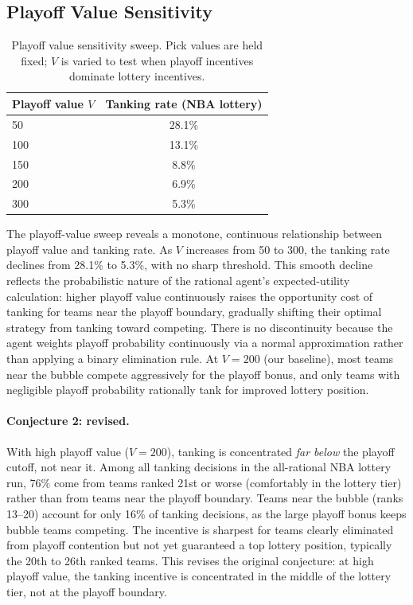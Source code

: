 \documentclass{article}
\begin{document}
\subsection{Playoff Value Sensitivity}

\begin{table}[h]
\centering
\renewcommand{\arraystretch}{1.2}
\begin{tabular}{lc}
\toprule
\textbf{Playoff value $V$} & \textbf{Tanking rate (NBA lottery)} \\
\midrule
50  & 28.1\% \\
100 & 13.1\% \\
150 &  8.8\% \\
200 &  6.9\% \\
300 &  5.3\% \\
\bottomrule
\end{tabular}
\caption{Playoff value sensitivity sweep. Pick values are held fixed;
$V$ is varied to test when playoff incentives dominate lottery incentives.}
\label{tab:pvsweep}
\end{table}

The playoff-value sweep reveals a monotone, continuous relationship between
playoff value and tanking rate.
As $V$ increases from 50 to 300, the tanking rate declines from 28.1\% to
5.3\%, with no sharp threshold.
This smooth decline reflects the probabilistic nature of the rational agent's
expected-utility calculation: higher playoff value continuously raises the
opportunity cost of tanking for teams near the playoff boundary, gradually
shifting their optimal strategy from tanking toward competing.
There is no discontinuity because the agent weights playoff probability
continuously via a normal approximation rather than applying a binary
elimination rule.
At $V = 200$ (our baseline), most teams near the bubble compete aggressively
for the playoff bonus, and only teams with negligible playoff probability
rationally tank for improved lottery position.

\paragraph{Conjecture 2: revised.}
With high playoff value ($V = 200$), tanking is concentrated \emph{far below}
the playoff cutoff, not near it.
Among all tanking decisions in the all-rational NBA lottery run, 76\% come
from teams ranked 21st or worse (comfortably in the lottery tier) rather
than from teams near the playoff boundary.
Teams near the bubble (ranks 13--20) account for only 16\% of tanking
decisions, as the large playoff bonus keeps bubble teams competing.
The incentive is sharpest for teams clearly eliminated from playoff contention
but not yet guaranteed a top lottery position, typically the 20th to 26th
ranked teams.
This revises the original conjecture: at high playoff value, the tanking
incentive is concentrated in the middle of the lottery tier, not at the
playoff boundary.
\end{document}
